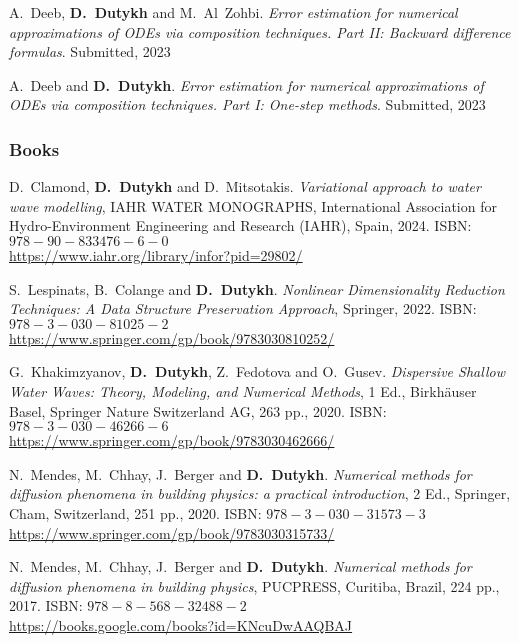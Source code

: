 \begin{etaremune}
  \item A.~Deeb, \textbf{D.~Dutykh} and M.~Al~Zohbi. \textit{Error estimation for numerical approximations of ODEs via composition techniques. Part II: Backward difference formulas}. Submitted, 2023 %

  \item A.~Deeb and \textbf{D.~Dutykh}. \textit{Error estimation for numerical approximations of ODEs via composition techniques. Part I: One-step methods}. Submitted, 2023 %

\end{etaremune}

\separator
\subsubsection{Books}

\begin{etaremune}

  \item D.~Clamond, \textbf{D.~Dutykh} and D.~Mitsotakis. \textit{Variational approach to water wave modelling}, IAHR WATER MONOGRAPHS, International Association for Hydro-Environment Engineering and Research (IAHR), Spain, 2024. ISBN: $978-90-833476-6-0$ \\
  \url{https://www.iahr.org/library/infor?pid=29802/}

  \item S.~Lespinats, B.~Colange and \textbf{D.~Dutykh}. \textit{Nonlinear Dimensionality Reduction Techniques: A Data Structure Preservation Approach}, Springer, 2022. ISBN: $978-3-030-81025-2$ \\
  \url{https://www.springer.com/gp/book/9783030810252/}

  \item G.~Khakimzyanov, \textbf{D.~Dutykh}, Z.~Fedotova and O.~Gusev. \textit{Dispersive Shallow Water Waves: Theory, Modeling, and Numerical Methods}, 1 Ed., Birkh\"auser Basel, Springer Nature Switzerland AG, 263 pp., 2020. ISBN: $978-3-030-46266-6$ \\
  \url{https://www.springer.com/gp/book/9783030462666/}

  \item N.~Mendes, M.~Chhay, J.~Berger and \textbf{D.~Dutykh}. \textit{Numerical methods for diffusion phenomena in building physics: a practical introduction}, 2 Ed., Springer, Cham, Switzerland, 251 pp., 2020. ISBN: $978-3-030-31573-3$ \\
  \url{https://www.springer.com/gp/book/9783030315733/}

  \item N.~Mendes, M.~Chhay, J.~Berger and \textbf{D.~Dutykh}. \textit{Numerical methods for diffusion phenomena in building physics}, PUCPRESS, Curitiba, Brazil, 224 pp., 2017. ISBN: $978-8-568-32488-2$ \\
  \url{https://books.google.com/books?id=KNcuDwAAQBAJ}
  
\end{etaremune}

